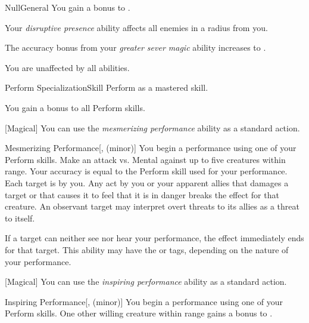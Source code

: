 \begin{feat}{Null}{General}
         You gain a  bonus to .

         Your \textit{disruptive presence} ability affects all enemies in a \arealarge radius  from you.

         The accuracy bonus from your \textit{greater sever magic} ability increases to .

         You are unaffected by all  abilities.
    \end{feat}

    \begin{feat}{Perform Specialization}{Skill}
        \featpre Perform as a mastered skill.

         You gain a  bonus to all Perform skills.

        [Magical] You can use the \textit{mesmerizing performance} ability as a standard action.
        \begin{apability}{Mesmerizing Performance}[,  (minor)]
            You begin a performance using one of your Perform skills.
            Make an attack vs. Mental against up to five creatures within \rngmed range.
            Your accuracy is equal to the Perform skill used for your performance.
            \hit Each target is \fascinated by you.
            Any act by you or your apparent allies that damages a target or that causes it to feel that it is in danger breaks the effect for that creature.
            An observant target may interpret overt threats to its allies as a threat to itself.

            If a target can neither see nor hear your performance, the effect immediately ends for that target.
            This ability may have the  or  tags, depending on the nature of your performance.
        \end{apability}

        [Magical] You can use the \textit{inspiring performance} ability as a standard action.
        \begin{apability}{Inspiring Performance}[,  (minor)]
            You begin a performance using one of your Perform skills.
            One other willing creature within \rngmed range gains a  bonus to .


\end{apability}
\end{feat}
